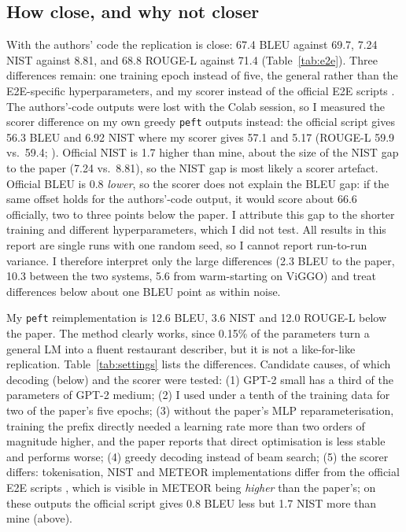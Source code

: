 \documentclass[11pt]{article}
\begin{document}
\subsection{How close, and why not closer}
\label{sec:howclose}
With the authors' code the replication is close: 67.4 BLEU against 69.7, 7.24 NIST against 8.81, and 68.8 ROUGE-L against 71.4 (Table~\ref{tab:e2e}). Three differences remain: one training epoch instead of five, the general rather than the E2E-specific hyperparameters, and my scorer instead of the official E2E scripts \citep{dusek-etal-2020-e2e}. The authors'-code outputs were lost with the Colab session, so I measured the scorer difference on my own greedy \texttt{peft} outputs instead: the official script gives 56.3 BLEU and 6.92 NIST where my scorer gives 57.1 and 5.17 (ROUGE-L 59.9 vs.\ 59.4; ). Official NIST is 1.7 higher than mine, about the size of the NIST gap to the paper (7.24 vs.\ 8.81), so the NIST gap is most likely a scorer artefact. Official BLEU is 0.8 \emph{lower}, so the scorer does not explain the BLEU gap: if the same offset holds for the authors'-code output, it would score about 66.6 officially, two to three points below the paper. I attribute this gap to the shorter training and different hyperparameters, which I did not test. All results in this report are single runs with one random seed, so I cannot report run-to-run variance. I therefore interpret only the large differences (2.3 BLEU to the paper, 10.3 between the two systems, 5.6 from warm-starting on ViGGO) and treat differences below about one BLEU point as within noise.

My \texttt{peft} reimplementation is 12.6 BLEU, 3.6 NIST and 12.0 ROUGE-L below the paper. The method clearly works, since 0.15\% of the parameters turn a general LM into a fluent restaurant describer, but it is not a like-for-like replication. Table~\ref{tab:settings} lists the differences. Candidate causes, of which decoding (below) and the scorer were tested: (1) GPT-2 small has a third of the parameters of GPT-2 medium; (2) I used under a tenth of the training data for two of the paper's five epochs; (3) without the paper's MLP reparameterisation, training the prefix directly needed a learning rate more than two orders of magnitude higher, and the paper reports that direct optimisation is less stable and performs worse; (4) greedy decoding instead of beam search; (5) the scorer differs: tokenisation, NIST and METEOR implementations differ from the official E2E scripts \citep{dusek-etal-2020-e2e}, which is visible in METEOR being \emph{higher} than the paper's; on these outputs the official script gives 0.8 BLEU less but 1.7 NIST more than mine (above).
\end{document}
